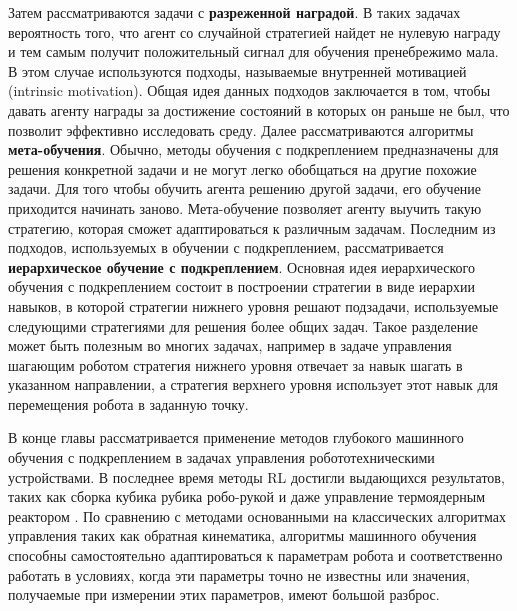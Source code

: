 Затем рассматриваются задачи с \textbf{разреженной наградой}. В таких задачах вероятность того, что агент со случайной стратегией найдет не нулевую награду и тем самым получит положительный сигнал для обучения пренебрежимо мала. В этом случае используются подходы, называемые внутренней мотивацией (intrinsic motivation). Общая идея данных подходов заключается в том, чтобы давать агенту награды за достижение состояний в которых он раньше не был, что позволит эффективно исследовать среду. 
Далее рассматриваются алгоритмы \textbf{мета-обучения}. Обычно, методы обучения с подкреплением предназначены для
решения конкретной задачи и не могут легко обобщаться на другие похожие задачи. Для того чтобы обучить агента решению другой задачи, его обучение
приходится начинать заново. Мета-обучение позволяет агенту выучить такую стратегию, которая сможет адаптироваться к различным задачам. Последним из подходов, используемых в обучении с подкреплением, рассматривается \textbf{иерархическое обучение с подкреплением}. Основная идея иерархического обучения с подкреплением состоит в построении стратегии в виде иерархии навыков, в которой стратегии нижнего уровня решают подзадачи, используемые следующими стратегиями для решения более общих задач. Такое разделение может быть полезным во многих задачах, например в задаче управления шагающим роботом стратегия нижнего уровня отвечает за навык шагать в указанном направлении, а стратегия верхнего уровня использует этот навык для перемещения робота в заданную точку. 

В конце главы рассматривается применение методов глубокого машинного обучения с подкреплением в задачах управления робототехническими устройствами. В последнее время методы RL достигли выдающихся результатов, таких как сборка кубика рубика робо-рукой \cite{rubic} и даже управление термоядерным реактором \cite{tokomak}. По сравнению с методами основанными на классических алгоритмах управления таких как обратная кинематика, алгоритмы машинного обучения способны самостоятельно адаптироваться к параметрам робота и соответственно работать в условиях, когда эти параметры точно не известны или значения, получаемые при измерении этих параметров, имеют большой разброс. 

